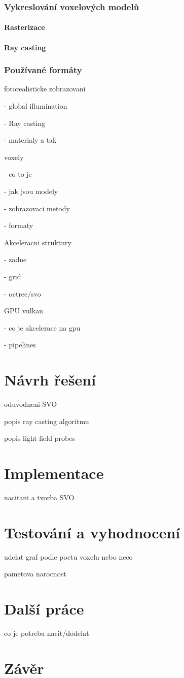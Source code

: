 \subsection{Vykreslování voxelových modelů}

\subsubsection{Rasterizace}
\subsubsection{Ray casting}

\subsection{Používané formáty}

fotorealisticke zobrazovani

 - global illumination

 - Ray casting
 
 - materialy a tak

voxely 

 - co to je
 
 - jak jsou modely
 
 - zobrazovaci metody
 
 - formaty

Akceleracni struktury

 - zadne
 
 - grid
 
 - octree/svo
 
GPU vulkan

 - co je akcelerace na gpu

 - pipelines

\chapter{Návrh řešení}
\label{navrh}
oduvodneni SVO

popis ray casting algoritmu

popis light field probes

\chapter{Implementace}
\label{implementace}
nacitani a tvorba SVO


\chapter{Testování a vyhodnocení}
\label{testovani}
udelat graf podle poctu voxelu nebo neco

pametova narocnost

\chapter{Další práce}
\label{dalsi_prace}
co je potreba nacit/dodelat


\chapter{Závěr}
\label{zaver}




